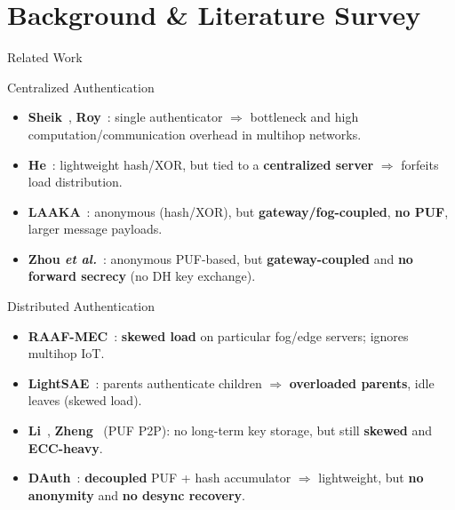 \section{Background \& Literature Survey}

\begin{frame}{Related Work}
    \scriptsize
    \begin{block}{Centralized Authentication}
        \begin{itemize}
            \item \textbf{Sheik}~\cite{sheik}, \textbf{Roy}~\cite{roy}: single authenticator
            $\Rightarrow$ bottleneck and high computation/communication overhead in multihop networks.
            \item \textbf{He}~\cite{he}: lightweight hash/XOR, but tied to a \textbf{centralized server}
            $\Rightarrow$ forfeits load distribution.
            \item \textbf{LAAKA}~\cite{laaka}: anonymous (hash/XOR), but \textbf{gateway/fog-coupled},
            \textbf{no PUF}, larger message payloads.
            \item \textbf{Zhou \emph{et al.}}~\cite{zhou}: anonymous PUF-based, but \textbf{gateway-coupled}
            and \textbf{no forward secrecy} (no DH key exchange).
        \end{itemize}
    \end{block}
    \begin{block}{Distributed Authentication}
        \begin{itemize}
            \item \textbf{RAAF-MEC}~\cite{raaf}: \textbf{skewed load} on particular fog/edge servers;
            ignores multihop IoT.
            \item \textbf{LightSAE}~\cite{lightsae}: parents authenticate children $\Rightarrow$
            \textbf{overloaded parents}, idle leaves (skewed load).
            \item \textbf{Li}~\cite{li}, \textbf{Zheng}~\cite{zheng} (PUF P2P): no long-term key
            storage, but still \textbf{skewed} and \textbf{ECC-heavy}.
            \item \textbf{DAuth}~\cite{dauth}: \textbf{decoupled} PUF + hash accumulator $\Rightarrow$
            lightweight, but \textbf{no anonymity} and \textbf{no desync recovery}.
        \end{itemize}
    \end{block}
\end{frame}

